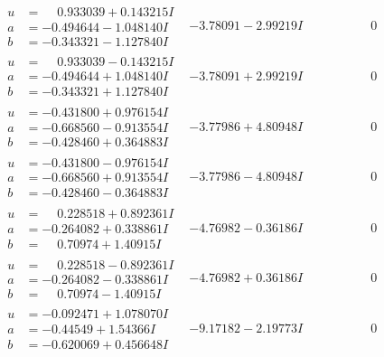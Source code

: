 \documentclass[1p]{elsarticle_modified}
\theoremstyle{definition}
\begin{document}
$$\begin{array}{c|c|c}
\begin{aligned}
u &= \phantom{-}0.933039 + 0.143215 I \\
a &= -0.494644 - 1.048140 I \\
b &= -0.343321 - 1.127840 I\end{aligned}
 & -3.78091 - 2.99219 I & \phantom{-0.000000 } 0 \\ \hline\begin{aligned}
u &= \phantom{-}0.933039 - 0.143215 I \\
a &= -0.494644 + 1.048140 I \\
b &= -0.343321 + 1.127840 I\end{aligned}
 & -3.78091 + 2.99219 I & \phantom{-0.000000 } 0 \\ \hline\begin{aligned}
u &= -0.431800 + 0.976154 I \\
a &= -0.668560 - 0.913554 I \\
b &= -0.428460 + 0.364883 I\end{aligned}
 & -3.77986 + 4.80948 I & \phantom{-0.000000 } 0 \\ \hline\begin{aligned}
u &= -0.431800 - 0.976154 I \\
a &= -0.668560 + 0.913554 I \\
b &= -0.428460 - 0.364883 I\end{aligned}
 & -3.77986 - 4.80948 I & \phantom{-0.000000 } 0 \\ \hline\begin{aligned}
u &= \phantom{-}0.228518 + 0.892361 I \\
a &= -0.264082 + 0.338861 I \\
b &= \phantom{-}0.70974 + 1.40915 I\end{aligned}
 & -4.76982 - 0.36186 I & \phantom{-0.000000 } 0 \\ \hline\begin{aligned}
u &= \phantom{-}0.228518 - 0.892361 I \\
a &= -0.264082 - 0.338861 I \\
b &= \phantom{-}0.70974 - 1.40915 I\end{aligned}
 & -4.76982 + 0.36186 I & \phantom{-0.000000 } 0 \\ \hline\begin{aligned}
u &= -0.092471 + 1.078070 I \\
a &= -0.44549 + 1.54366 I \\
b &= -0.620069 + 0.456648 I\end{aligned}
 & -9.17182 - 2.19773 I & \phantom{-0.000000 } 0 \\ \hline\begin{aligned}

\end{aligned}
\end{array}$$
\end{document}
